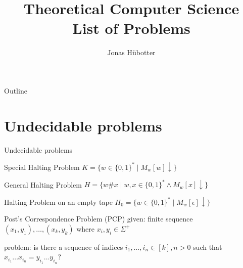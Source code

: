 \documentclass{beamer}
\title[Theoretical Computer Science]{Theoretical Computer Science \\ List of Problems}
\author{Jonas Hübotter}
\date{}
\theoremstyle{definition}
\begin{document}
\begin{frame}
  \titlepage
\end{frame}

\begin{frame}[allowframebreaks]{Outline}
 \tableofcontents[subsubsectionstyle=hide]
\end{frame}

\section{Undecidable problems}

\begin{frame}{Undecidable problems}

\begin{block}{Special Halting Problem}
$K = \{w \in \{0,1\}^* \mid M_w[w]\downarrow\}$
\end{block}\pause

\begin{block}{General Halting Problem}
$H = \{w\#x \mid w,x \in \{0,1\}^* \land M_w[x]\downarrow\}$
\end{block}\pause

\begin{block}{Halting Problem on an empty tape}
$H_0 = \{w \in \{0,1\}^* \mid M_w[\epsilon]\downarrow\}$
\end{block}\pause

\begin{block}{Post's Correspondence Problem (PCP)}
given: finite sequence $(x_1, y_1), \ldots, (x_k, y_k)$ where $x_i,y_i \in \Sigma^+$\par
problem: is there a sequence of indices $i_1,\ldots,i_n \in [k], n > 0$ such that $x_{i_1} \dots x_{i_n} = y_{i_1} \dots y_{i_n}$?
\end{block}

\end{frame}
\end{document}
